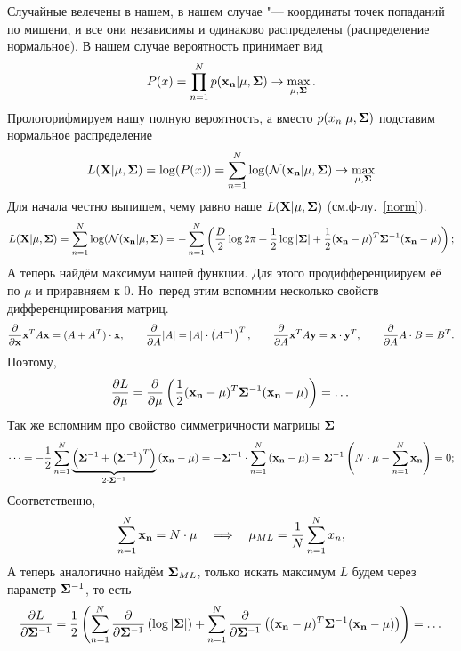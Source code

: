 \begin{Solution}

Случайные велечены в нашем, в нашем случае "--- координаты точек попаданий по мишени, и все они независимы и одинаково распределены (распределение нормальное). В нашем случае вероятность принимает вид
\[
P(x) = \prod\limits_{n=1}^{N} p({\bf x_n}|\mu,{\bf \Sigma}) \to \max\limits_{\mu, {\bf \Sigma}}.
\]
Прологорифмируем нашу полную вероятность, а вместо $p(x_n|\mu,{\bf \Sigma})$ подставим нормальное распределение 
\[
 L({\bf X}|\mu,{\bf {\bf \Sigma}}) = \log(P(x)) = \sum\limits_{n = 1}^{N} \log(\NN({\bf x_n}|\mu,{\bf \Sigma}) \to \max\limits_{\mu, {\bf \Sigma}} 
\]
Для начала честно выпишем, чему равно наше $L({\bf X}|\mu,{\bf {\bf \Sigma}})$ (см.ф-лу.~\ref{norm}).
\[
 L({\bf X}|\mu,{\bf {\bf \Sigma}}) = \sum\limits_{n = 1}^{N} \log(\NN({\bf x_n}|\mu,{\bf \Sigma}) = - \sum\limits_{n=1}^{N}\left(\frac{D}{2} \log 2\pi  +  \frac{1}{2} \log |{\bf {\bf \Sigma}}| + \frac{1}{2} ({\bf x_n} -\mu)^T {\bf {\bf \Sigma}}^{-1} ({\bf x_n} -\mu) \right);
\]
А теперь найдём максимум нашей функции. Для этого продифференциируем её по $\mu$ и приравняем к $0$. Но~перед этим вспомним несколько свойств дифференциирования матриц.
\[
\frac{\partial }{\partial {\bf x}} {\bf x}^T A {\bf x} = (A + A^T)\cdot {\bf x},
\qquad
\frac{\partial }{\partial A} |A| = |A|\cdot \left(A^{-1}\right)^T, 
\qquad
\frac{\partial }{\partial A} {\bf x}^T A{\bf y} = {\bf x}\cdot {\bf y}^T,
\qquad
\frac{\partial }{\partial A} A \cdot B = B^T.
\] 
Поэтому,
\[
\frac{\partial L}{\partial \mu} = \frac{\partial}{\partial \mu}
\left(\frac{1}{2} ({\bf x_n} -\mu)^T {\bf {\bf \Sigma}}^{-1} ({\bf x_n} -\mu) \right) = \dots
\]
Так же вспомним про свойство симметричности матрицы ${\bf \Sigma}$
\[
\dots = 
-\frac{1}{2}\sum\limits_{n = 1}^{N} \underbrace{\left({\bf \Sigma}^{-1} + \left({\bf \Sigma}^{-1} \right)^T \right)}_{2\cdot {\bf \Sigma}^{-1}} \left( {\bf x_n} - \mu \right) 
=
-{\bf \Sigma}^{-1} \cdot \sum\limits_{n = 1}^{N} \left( {\bf x_n} - \mu \right) 
=
 {\bf \Sigma}^{-1} \left(N\cdot \mu - \sum\limits_{n = 1}^{N} {\bf x_n} \right) = 0;
\]
Соответственно,
\[
\sum_{n=1}^{N}  {\bf x_n} = N \cdot \mu \quad \Longrightarrow \quad
 \mu_{ML} = \frac{1}{N} \sum_{n=1}^{N} x_n, 
\]
А теперь аналогично найдём ${\bf \Sigma}_{ML}$, только  искать максимум $L$ будем через параметр ${\bf \Sigma}^{-1}$, то есть
\[
\frac{\partial L}{\partial {\bf \Sigma}^{-1}} = 
 \frac{1}{2} \left(\sum\limits_{n=1}^{N} \frac{\partial}{\partial {\bf \Sigma}^{-1}} \left(\log |{\bf {\bf \Sigma}}|\right) +  \sum\limits_{n=1}^{N}\frac{\partial}{\partial {\bf \Sigma}^{-1}} \left( ({\bf x_n} -\mu)^T {\bf {\bf \Sigma}}^{-1} ({\bf x_n} -\mu) \right) \right) = \dots
\]
\end{Solution}
